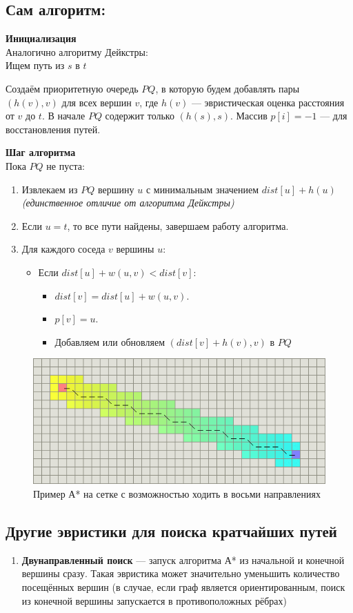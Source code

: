 \subsection*{Сам алгоритм:}
\textbf{Инициализация}\\
Аналогично алгоритму Дейкстры:\\

Ищем путь из $s$ в $t$

Создаём приоритетную очередь $PQ$, в которую будем добавлять пары $(h(v), v)$ для всех вершин $v$, где $h(v)$ --- эвристическая оценка расстояния от $v$ до $t$.
В начале $PQ$ содержит только $(h(s), s)$. 
Массив $p[i] = -1$ --- для восстановления путей.

\textbf{Шаг алгоритма}\\
Пока $PQ$ не пуста:
\begin{enumerate}
	\item Извлекаем из $PQ$ вершину $u$ с минимальным значением $dist[u] + h(u)$ \textit{(единственное отличие от алгоритма Дейкстры)}
	\item Если $u = t$, то все пути найдены, завершаем работу алгоритма.
	\item Для каждого соседа $v$ вершины $u$:
	\begin{itemize}
		\item Если $dist[u] + w(u, v) < dist[v]$:
		\begin{itemize}
			\item $dist[v] = dist[u] + w(u, v)$.
			\item $p[v] = u$.
			\item Добавляем или обновляем $(dist[v] + h(v), v)$ в $PQ$
		\end{itemize}
	\end{itemize}
\end{enumerate}

\begin{figure}[h!]
	\centering
	\includegraphics[width=0.7\linewidth]{img_easy/9_1.png}
	\captionsetup{labelformat=empty}
	\caption{Пример А* на сетке с возможностью ходить в восьми направлениях}
\end{figure}

\subsection*{Другие эвристики для поиска кратчайших путей}
\begin{enumerate}
	\item \textbf{Двунаправленный поиск} --- запуск алгоритма А* из начальной и конечной вершины сразу.
	Такая эвристика может значительно уменьшить количество посещённых вершин (в случае, если граф является ориентированным, поиск из конечной вершины запускается в противоположных рёбрах)
\end{enumerate}